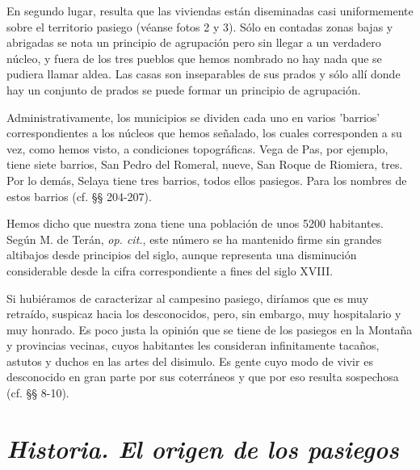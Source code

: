 \documentclass[11pt,spanish,b5paper]{book}
\begin{document}
En segundo lugar, resulta que las viviendas están diseminadas casi uniformemente sobre el territorio pasiego (véanse fotos 2 y 3). Sólo en contadas zonas bajas y abrigadas se nota un principio de agrupación pero sin llegar a un verdadero núcleo, y fuera de los tres pueblos que
hemos nombrado no hay nada que se pudiera llamar aldea. Las casas son inseparables de sus prados y sólo allí donde hay un conjunto de prados se puede formar un principio de agrupación.

Administrativamente, los municipios se dividen cada uno en varios 'barrios' correspondientes a los núcleos que hemos señalado, los cuales corresponden a su vez, como hemos visto, a condiciones topográficas. Vega de Pas, por ejemplo, tiene siete barrios, San Pedro del Romeral,
nueve, San Roque de Riomiera, tres. Por lo demás, Selaya tiene tres barrios, todos ellos pasiegos. Para los nombres de estos barrios (cf. §§ 204-207).

Hemos dicho que nuestra zona tiene una población de unos 5200 habitantes. Según M. de Terán, \emph{op. cit.}, este número se ha mantenido firme sin grandes altibajos desde principios del siglo, aunque representa una disminución considerable desde la cifra correspondiente a fines del
siglo XVIII.

Si hubiéramos de caracterizar al campesino pasiego, diríamos que es muy retraído, suspicaz hacia los desconocidos, pero, sin embargo, muy hospitalario y muy honrado. Es poco justa la opinión que se tiene de los pasiegos en la Montaña y provincias vecinas, cuyos habitantes les consideran infinitamente tacaños, astutos y duchos en las artes del disimulo. Es gente cuyo modo de vivir es desconocido en gran parte por sus coterráneos y que por eso resulta sospechosa (cf. §§ 8-10).

\section{\emph{Historia. El origen de los pasiegos}}
\end{document}
